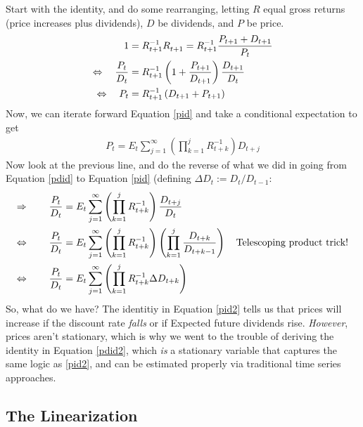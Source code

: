 \documentclass[12pt]{article}
\theoremstyle{plain}
\theoremstyle{definition}
\theoremstyle{remark}
\begin{document}
Start with the identity, and do some rearranging, letting $R$ equal
gross returns (price increases plus dividends), $D$ be dividends,
and $P$ be price.
\begin{align}
    1 &= R^{-1}_{t+1} R^{}_{t+1} = R^{-1}_{t+1} \frac{P_{t+1} + D_{t+1}}{P_t} \notag \\
    \Leftrightarrow \quad \frac{P_t}{D_t} &=
	R^{-1}_{t+1} \left( 1 + \frac{P_{t+1}}{D_{t+1}}\right) \frac{D_{t+1}}{D_t}
	\label{pdid} \\
    \Leftrightarrow \quad {P_t} &=
	R^{-1}_{t+1} \left( {D_{t+1}} + {P_{t+1}}\right)
	\label{pid}
\end{align}
Now, we can iterate forward Equation \ref{pid} and take a conditional
expectation to get
\begin{align}
    \label{pid2}
    P_t = E_t \sum^\infty_{j=1} \left(\prod^j_{k=1} R^{-1}_{t+k} \right)
	D_{t+j}
\end{align}
Now look at the previous line, and do the reverse of what we did
in going from Equation \ref{pdid} to Equation \ref{pid} (defining
$\Delta D_t := D_t / D_{t-1}$:
\begin{align}
    \Rightarrow \qquad \frac{P_t}{D_t} &= E_t \sum^\infty_{j=1}
	\left(\prod^j_{k=1} R^{-1}_{t+k} \right)  \frac{D_{t+j}}{D_t}
	\notag \\
    \Leftrightarrow \qquad \frac{P_t}{D_t} &= E_t \sum^\infty_{j=1}
	\left(\prod^j_{k=1} R^{-1}_{t+k} \right)
	\left(\prod^{j}_{k=1} \frac{D_{t+k}}{D_{t+k-1}}\right) \quad
	\text{Telescoping product trick!} \notag \\
    \Leftrightarrow \qquad \frac{P_t}{D_t} &= E_t \sum^\infty_{j=1}
	\left(\prod^j_{k=1} R^{-1}_{t+k} \Delta D_{t+k} \right)
	\label{pdid2}
\end{align}
So, what do we have? The identitiy in Equation \ref{pid2} tells us that
prices will increase if the discount rate \emph{falls} or if Expected
future dividends rise.  \emph{However}, prices aren't stationary, which
is why we went to the trouble of deriving the identity in
Equation \ref{pdid2}, which \emph{is} a stationary variable that
captures the same logic as \ref{pid2}, and can be estimated properly
via traditional time series approaches.


\subsection{The Linearization}
\end{document}
